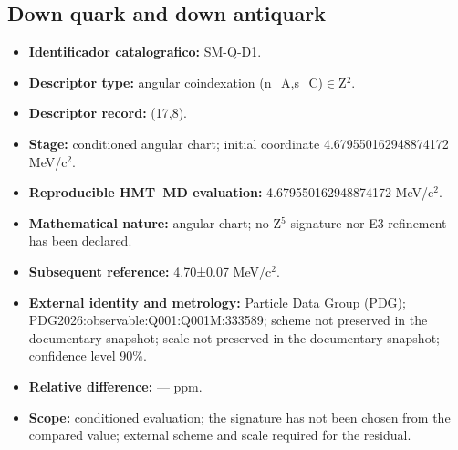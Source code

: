 \subsection{Down quark and down antiquark}
\begin{itemize}
\item \textbf{Identificador catalografico:} SM-Q-D1.
\item \textbf{Descriptor type:} angular coindexation (n\_A,s\_C)\(\in\)Z\({}^{2}\).
\item \textbf{Descriptor record:} (17,8).
\item \textbf{Stage:} conditioned angular chart; initial coordinate 4.679550\allowbreak{}162948\allowbreak{}874172 MeV/c\({}^{2}\).
\item \textbf{Reproducible HMT--MD evaluation:} 4.679550\allowbreak{}162948\allowbreak{}874172 MeV/c\({}^{2}\).
\item \textbf{Mathematical nature:} angular chart; no Z\({}^{5}\) signature nor E3 refinement has been declared.
\item \textbf{Subsequent reference:} 4.70±\allowbreak{}0.07 MeV/c\({}^{2}\).
\item \textbf{External identity and metrology:} Particle Data Group (PDG); PDG2026:\allowbreak{}observable:\allowbreak{}Q001:\allowbreak{}Q001M:\allowbreak{}333589; scheme not preserved in the documentary snapshot; scale not preserved in the documentary snapshot; confidence level 90\%.
\item \textbf{Relative difference:} --- ppm.
\item \textbf{Scope:} conditioned evaluation; the signature has not been chosen from the compared value; external scheme and scale required for the residual.
\end{itemize}
